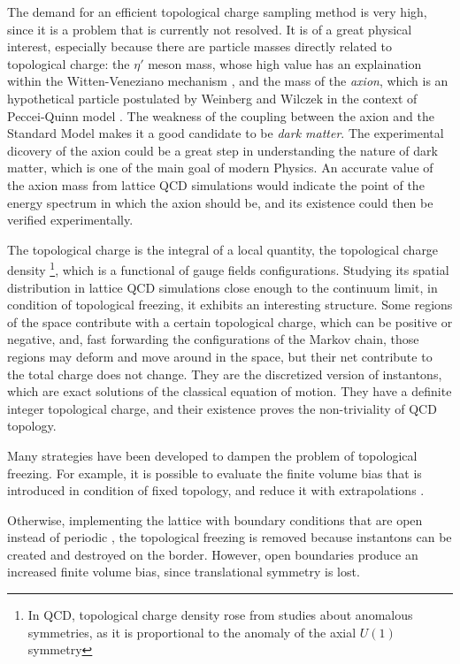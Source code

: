 The demand for an efficient topological charge sampling method is very high, since it is a problem that is currently not resolved.
It is of a great physical interest, especially because there are particle masses directly related to topological charge:
the $\eta'$ meson mass, whose high value has an explaination within the Witten-Veneziano mechanism \cite{witten:1979-1, witten:1979-2, veneziano:1979},
and the mass of the \emph{axion}, which is an hypothetical particle postulated by Weinberg \cite{weinberg:1978} and Wilczek \cite{wilczek:1978}
in the context of Peccei-Quinn model \cite{peccei-quinn:1977-1, peccei-quinn:1977-2}.
The weakness of the coupling between the axion and the Standard Model makes it a good candidate to be \emph{dark matter}.
The experimental dicovery of the axion could be a great step in understanding the nature of dark matter, which is one of the main goal of modern Physics.
An accurate value of the axion mass from lattice QCD simulations would indicate the point of the energy spectrum in which the axion should be,
and its existence could then be verified experimentally.

The topological charge is the integral of a local quantity, the topological charge density%
\footnote{In QCD, topological charge density rose from studies about anomalous symmetries, as it is proportional to the anomaly of the axial $U(1)$ symmetry},
which is a functional of gauge fields configurations.
Studying its spatial distribution in lattice QCD simulations close enough to the continuum limit, in condition of topological freezing, it exhibits an interesting structure.
Some regions of the space contribute with a certain topological charge, which can be positive or negative, and,
fast forwarding the configurations of the Markov chain,
those regions may deform and move around in the space, but their net contribute to the total charge does not change.
They are the discretized version of instantons, which are exact solutions of the classical equation of motion.
They have a definite integer topological charge, and their existence proves the non-triviality of QCD topology.

Many strategies have been developed to dampen the problem of topological freezing.
For example, it is possible to evaluate the finite volume bias that is introduced in condition of fixed topology,
and reduce it with extrapolations \cite{brower:2003}.

Otherwise, implementing the lattice with boundary conditions that are open instead of periodic \cite{luescher:2011},
the topological freezing is removed because instantons can be created and destroyed on the border.
However, open boundaries produce an increased finite volume bias, since translational symmetry is lost.

